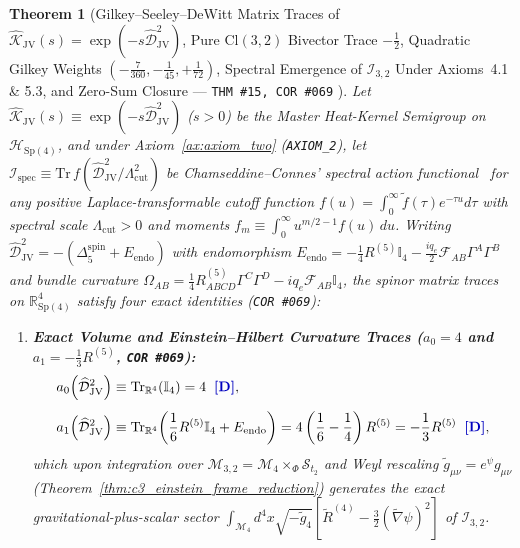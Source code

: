 \documentclass[11pt,a4paper]{article}
\newcommand{\catD}{\text{\textbf{\textcolor{blue!75!black}{[D]}}}}
\theoremstyle{definition}
\theoremstyle{plain}
\newtheorem{theorem}[axiom]{Theorem}
\theoremstyle{remark}
\begin{document}
\begin{theorem}[{Gilkey--Seeley--DeWitt Matrix Traces of $\widehat{\mathcal{K}}_{\mathrm{JV}}(s) = \exp(-s\widehat{\mathcal{D}}_{\mathrm{JV}}^2)$, Pure $\mathrm{Cl}(3,2)$ Bivector Trace $-\frac{1}{2}$, Quadratic Gilkey Weights $(-\frac{7}{360}, -\frac{1}{45}, +\frac{1}{72})$, Spectral Emergence of $\mathcal{I}_{3,2}$ Under Axioms~4.1 \& 5.3, and Zero-Sum Closure --- \texttt{THM~\#15, COR~\#069} \catD}]\label{thm:c6_spectral_action_emergence}
Let $\widehat{\mathcal{K}}_{\mathrm{JV}}(s) \equiv \exp(-s\widehat{\mathcal{D}}_{\mathrm{JV}}^2)$ ($s > 0$) be the Master Heat-Kernel Semigroup on $\mathcal{H}_{\mathrm{Sp}(4)}$, and under Axiom~\ref{ax:axiom_two} (\texttt{AXIOM\_2}), let $\mathcal{I}_{\mathrm{spec}} \equiv \mathrm{Tr}\,f(\widehat{\mathcal{D}}_{\mathrm{JV}}^2/\Lambda_{\mathrm{cut}}^2)$ be Chamseddine--Connes' spectral action functional~\cite{ChamseddineConnes1997} for any positive Laplace-transformable cutoff function $f(u) = \int_0^\infty \tilde{f}(\tau)e^{-\tau u}d\tau$ with spectral scale $\Lambda_{\mathrm{cut}} > 0$ and moments $f_m \equiv \int_0^\infty u^{m/2-1}f(u)\,du$. Writing $\widehat{\mathcal{D}}_{\mathrm{JV}}^2 = -(\Delta_5^{\mathrm{spin}} + E_{\mathrm{endo}})$ with endomorphism $E_{\mathrm{endo}} = -\frac{1}{4}R^{(5)}\mathbb{I}_4 - \frac{iq_e}{2}\mathcal{F}_{AB}\Gamma^A\Gamma^B$ and bundle curvature $\Omega_{AB} = \frac{1}{4}R^{(5)}_{ABCD}\Gamma^C\Gamma^D - iq_e\mathcal{F}_{AB}\mathbb{I}_4$, the spinor matrix traces on $\mathbb{R}^4_{\mathrm{Sp}(4)}$ satisfy four exact identities (\texttt{COR~\#069}):
\begin{enumerate}[label=(\roman*)]
  \item \textbf{Exact Volume and Einstein--Hilbert Curvature Traces ($a_0 = 4$ and $a_1 = -\frac{1}{3}R^{(5)}$, \texttt{COR~\#069}):}
  \begin{align}
  a_0\!\left(\widehat{\mathcal{D}}_{\mathrm{JV}}^2\right) &\equiv \mathrm{Tr}_{\mathbb{R}^4}(\mathbb{I}_4) = 4 \;\;\catD, \nonumber \\[4pt]
  a_1\!\left(\widehat{\mathcal{D}}_{\mathrm{JV}}^2\right) &\equiv \mathrm{Tr}_{\mathbb{R}^4}\!\left(\frac{1}{6}R^{(5)}\mathbb{I}_4 + E_{\mathrm{endo}}\right) = 4\left(\frac{1}{6} - \frac{1}{4}\right)R^{(5)} = -\frac{1}{3}R^{(5)} \;\;\catD, \label{eq:c6_gilkey_a0_a1}
  \end{align}
  which upon integration over $\mathcal{M}_{3,2} = \mathcal{M}_4 \times_\Phi \mathcal{S}_{t_2}$ and Weyl rescaling $\tilde{g}_{\mu\nu} = e^\psi g_{\mu\nu}$ (Theorem~\ref{thm:c3_einstein_frame_reduction}) generates the exact gravitational-plus-scalar sector $\int_{\mathcal{M}_4} d^4x\sqrt{-\tilde{g}_4}\left[\tilde{R}^{(4)} - \frac{3}{2}(\tilde{\nabla}\psi)^2\right]$ of $\mathcal{I}_{3,2}$.

\end{enumerate}
\end{theorem}
\end{document}
